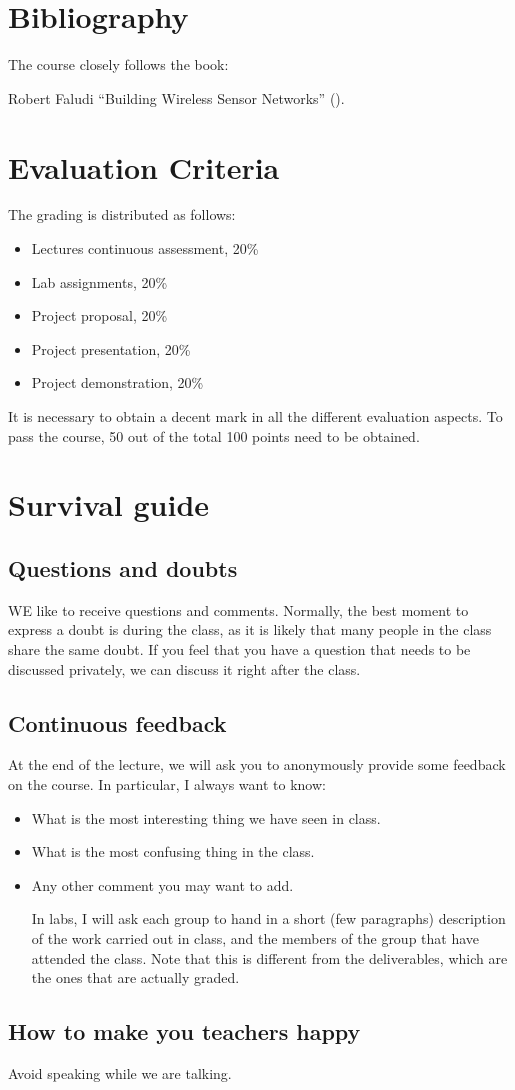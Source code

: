 \section{Bibliography}

The course closely follows the book:

Robert Faludi ``Building Wireless Sensor Networks'' (\cite{faludi2010bws}).

\section{Evaluation Criteria}

The grading is distributed as follows:
\begin{itemize}
\item Lectures continuous assessment, 20\%
\item Lab assignments, 20\%
\item Project proposal, 20\%
\item Project presentation, 20\%
\item Project demonstration, 20\%
\end{itemize}

It is necessary to obtain a decent mark in all the different evaluation aspects.
To pass the course, 50 out of the total 100 points need to be obtained.

\section{Survival guide}

\subsection{Questions and doubts}
WE like to receive questions and comments.
Normally, the best moment to express a doubt is during the class, as it is likely that many people in the class share the same doubt.
If you feel that you have a question that needs to be discussed privately, we can discuss it right after the class.

\subsection{Continuous feedback}
At the end of the lecture, we will ask you to anonymously provide some feedback on the course. 
In particular, I always want to know:
\begin{itemize}
\item What is the most interesting thing we have seen in class.
\item What is the most confusing thing in the class.
\item Any other comment you may want to add.

In labs, I will ask each group to hand in a short (few paragraphs) description of the work carried out in class, and the members of the group that have attended the class.
Note that this is different from the deliverables, which are the ones that are actually graded.
\end{itemize}

\subsection{How to make you teachers happy}

Avoid speaking while we are talking.
